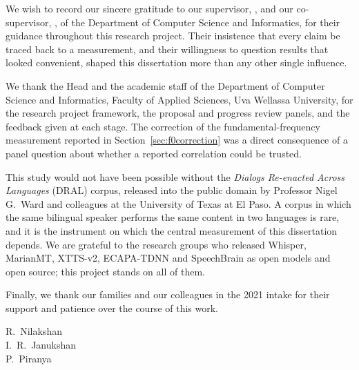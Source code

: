 
We wish to record our sincere gratitude to our supervisor, \supervisorname, and our
co-supervisor, \cosupervisorname, of the Department of Computer Science and Informatics, for
their guidance throughout this research project. Their insistence that every claim be traced
back to a measurement, and their willingness to question results that looked convenient, shaped
this dissertation more than any other single influence.

We thank the Head and the academic staff of the Department of Computer Science and Informatics,
Faculty of Applied Sciences, Uva Wellassa University, for the research project framework, the
proposal and progress review panels, and the feedback given at each stage. The correction of the
fundamental-frequency measurement reported in Section~\ref{sec:f0correction} was a direct consequence of a panel
question about whether a reported correlation could be trusted.

This study would not have been possible without the \emph{Dialogs Re-enacted Across Languages}
(DRAL) corpus, released into the public domain by Professor Nigel G.\ Ward and colleagues at the
University of Texas at El Paso. A corpus in which the same bilingual speaker performs the same
content in two languages is rare, and it is the instrument on which the central measurement of
this dissertation depends. We are grateful to the research groups who released Whisper, MarianMT,
XTTS-v2, ECAPA-TDNN and SpeechBrain as open models and open source; this project stands on all of
them.

Finally, we thank our families and our colleagues in the 2021 intake for their support and
patience over the course of this work.

\vspace{1.2\baselineskip}
\noindent R.\ Nilakshan\\
I.\ R.\ Janukshan\\
P.\ Piranya

